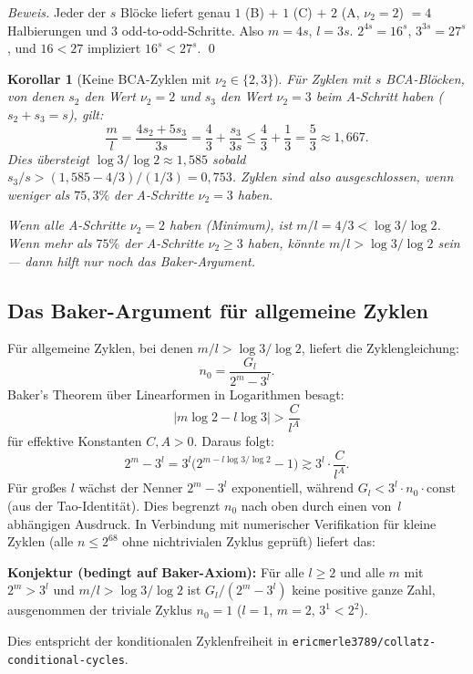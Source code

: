 \documentclass[12pt,a4paper]{article}
\newtheorem{korollar}[definition]{Korollar}
\newenvironment{beweis}{\begin{proof}[Beweis]}{\end{proof}}
\newcommand{\vii}{\nu_2}
\newcommand{\abs}[1]{\lvert#1\rvert}
\begin{document}
\begin{beweis}
Jeder der $s$ Blöcke liefert genau $1$ (B) $+$ $1$ (C) $+$ $2$ (A, $\vii=2$)
$= 4$ Halbierungen und $3$ odd-to-odd-Schritte. Also $m = 4s$, $l = 3s$.
$2^{4s} = 16^s$, $3^{3s} = 27^s$, und $16 < 27$ impliziert $16^s < 27^s$. \qed
\end{beweis}

\begin{korollar}[Keine B\textbullet C\textbullet A-Zyklen mit $\vii \in \{2,3\}$]
Für Zyklen mit $s$ B\textbullet C\textbullet A-Blöcken, von denen $s_2$ den Wert $\vii=2$
und $s_3$ den Wert $\vii=3$ beim A-Schritt haben ($s_2+s_3=s$), gilt:
\[
  \frac{m}{l} = \frac{4s_2 + 5s_3}{3s}
  = \frac{4}{3} + \frac{s_3}{3s}
  \leq \frac{4}{3} + \frac{1}{3} = \frac{5}{3} \approx 1{,}667.
\]
Dies übersteigt $\log3/\log2 \approx 1{,}585$ sobald $s_3/s > (1{,}585 - 4/3)/(1/3) = 0{,}753$.
Zyklen sind also ausgeschlossen, wenn weniger als $75{,}3\%$ der A-Schritte
$\vii = 3$ haben.

Wenn alle A-Schritte $\vii = 2$ haben (Minimum), ist $m/l = 4/3 < \log3/\log2$.
Wenn mehr als $75\%$ der A-Schritte $\vii \geq 3$ haben, könnte $m/l > \log3/\log2$
sein --- dann hilft nur noch das Baker-Argument.
\end{korollar}

\subsection{Das Baker-Argument für allgemeine Zyklen}

Für allgemeine Zyklen, bei denen $m/l > \log 3/\log 2$, liefert die
Zyklengleichung:
\[
  n_0 = \frac{G_l}{2^m - 3^l}.
\]
Baker's Theorem über Linearformen in Logarithmen besagt:
\[
  \abs{m \log 2 - l \log 3} > \frac{C}{l^A}
\]
für effektive Konstanten $C, A > 0$. Daraus folgt:
\[
  2^m - 3^l = 3^l\bigl(2^{m-l\log3/\log2} - 1\bigr) \gtrsim 3^l \cdot \frac{C}{l^A}.
\]
Für großes $l$ wächst der Nenner $2^m - 3^l$ exponentiell, während
$G_l < 3^l \cdot n_0 \cdot \text{const}$ (aus der Tao-Identität).
Dies begrenzt $n_0$ nach oben durch einen von~$l$ abhängigen Ausdruck.
In Verbindung mit numerischer Verifikation für kleine Zyklen
(alle $n \leq 2^{68}$ ohne nichtrivialen Zyklus geprüft) liefert das:

\begin{tcolorbox}[konj]
\textbf{Konjektur (bedingt auf Baker-Axiom):}
Für alle $l \geq 2$ und alle $m$ mit $2^m > 3^l$ und $m/l > \log3/\log2$
ist $G_l / (2^m - 3^l)$ keine positive ganze Zahl,
ausgenommen der triviale Zyklus $n_0 = 1$ ($l=1$, $m=2$, $3^1 < 2^2$).

Dies entspricht der konditionalen Zyklenfreiheit in
\texttt{ericmerle3789/collatz-conditional-cycles}.
\end{tcolorbox}
\end{document}
